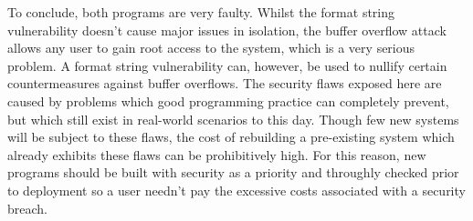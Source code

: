 To conclude, both programs are very faulty. Whilst the format string vulnerability doesn't cause major issues in
isolation, the buffer overflow attack allows any user to gain root access to the system, which is a very serious
problem. A format string vulnerability can, however, be used to nullify certain countermeasures against buffer
overflows. The security flaws exposed here are caused by problems which good programming practice can completely
prevent, but which still exist in real-world scenarios to this day. Though few new systems will be subject to these
flaws, the cost of rebuilding a pre-existing system which already exhibits these flaws can be prohibitively high. For
this reason, new programs should be built with security as a priority and throughly checked prior to deployment so a
user needn't pay the excessive costs associated with a security breach.

